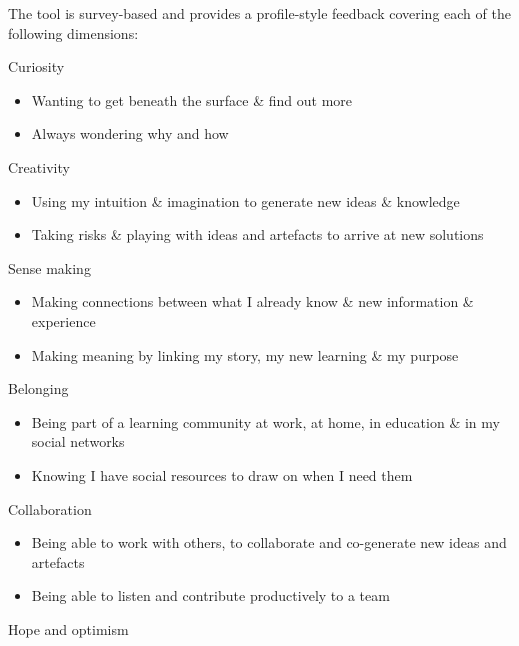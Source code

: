 \documentclass[]{book}
\providecommand{\tightlist}{%
  \setlength{\itemsep}{0pt}\setlength{\parskip}{0pt}}
\theoremstyle{definition}
\theoremstyle{definition}
\theoremstyle{remark}
\begin{document}
The tool is survey-based and provides a profile-style feedback covering
each of the following dimensions:

Curiosity

\begin{itemize}
\tightlist
\item
  Wanting to get beneath the surface \& find out more
\item
  Always wondering why and how
\end{itemize}

Creativity

\begin{itemize}
\tightlist
\item
  Using my intuition \& imagination to generate new ideas \& knowledge
\item
  Taking risks \& playing with ideas and artefacts to arrive at new
  solutions
\end{itemize}

Sense making

\begin{itemize}
\tightlist
\item
  Making connections between what I already know \& new information \&
  experience
\item
  Making meaning by linking my story, my new learning \& my purpose
\end{itemize}

Belonging

\begin{itemize}
\tightlist
\item
  Being part of a learning community at work, at home, in education \&
  in my social networks
\item
  Knowing I have social resources to draw on when I need them
\end{itemize}

Collaboration

\begin{itemize}
\tightlist
\item
  Being able to work with others, to collaborate and co-generate new
  ideas and artefacts
\item
  Being able to listen and contribute productively to a team
\end{itemize}

Hope and optimism
\end{document}
